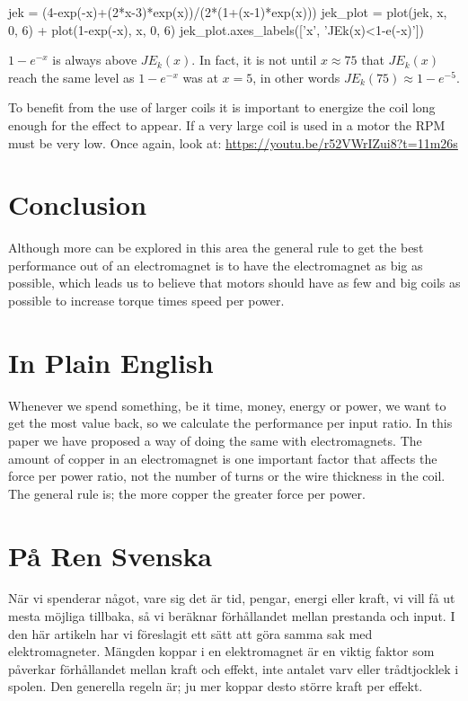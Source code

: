\documentclass[]{../common/elementary-physics}
\begin{document}
\begin{sagesilent}
jek = (4-exp(-x)+(2*x-3)*exp(x))/(2*(1+(x-1)*exp(x)))
jek_plot = plot(jek, x, 0, 6) + plot(1-exp(-x), x, 0, 6)
jek_plot.axes_labels(['x', 'JEk(x)<1-e(-x)'])
\end{sagesilent}


$1-e^{-x}$ is always above $JE_k(x)$.
In fact, it is not until $x \approx 75$ that $JE_k(x)$ reach the same level as $1-e^{-x}$ was at $x = 5$, in other words $JE_k(75) \approx 1-e^{-5}$.

To benefit from the use of larger coils it is important to energize the coil long enough for the effect to appear.
If a very large coil is used in a motor the RPM must be very low.
Once again, look at: \url{https://youtu.be/r52VWrIZui8?t=11m26s}

\section{Conclusion}

Although more can be explored in this area the general rule to get the best performance out of an electromagnet is to have the electromagnet as big as possible, which leads us to believe that motors should have as few and big coils as possible\cite{jonew} to increase torque times speed per power.

\appendix

\section{In Plain English}

Whenever we spend something, be it time, money, energy or power, we want to get the most value back, so we calculate the performance per input ratio.
In this paper we have proposed a way of doing the same with electromagnets.
The amount of copper in an electromagnet is one important factor that affects the force per power ratio, not the number of turns or the wire thickness in the coil.
The general rule is; the more copper the greater force per power.

\section{På Ren Svenska}

När vi spenderar något, vare sig det är tid, pengar, energi eller kraft, vi vill få ut mesta möjliga tillbaka, så vi beräknar förhållandet mellan prestanda och input.
I den här artikeln har vi föreslagit ett sätt att göra samma sak med elektromagneter.
Mängden koppar i en elektromagnet är en viktig faktor som påverkar förhållandet mellan kraft och effekt, inte antalet varv eller trådtjocklek i spolen.
Den generella regeln är; ju mer koppar desto större kraft per effekt.
\end{document}
